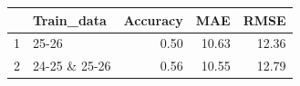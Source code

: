 \begin{table}[ht]
\centering
\begin{tabular}{rlrrr}
  \hline
 & Train\_data & Accuracy & MAE & RMSE \\ 
  \hline
1 & 25-26 & 0.50 & 10.63 & 12.36 \\ 
  2 & 24-25 \& 25-26 & 0.56 & 10.55 & 12.79 \\ 
   \hline
\end{tabular}
\end{table}
